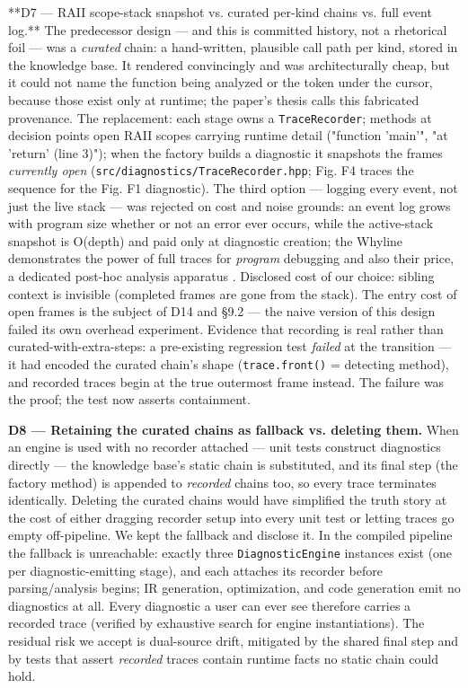 **D7 --- RAII scope-stack snapshot vs. curated per-kind chains vs.
full event log.** The predecessor design --- and this is committed
history, not a rhetorical foil --- was a \emph{curated} chain: a
hand-written, plausible call path per kind, stored in the knowledge
base. It rendered convincingly and was architecturally cheap, but it
could not name the function being analyzed or the token under the
cursor, because those exist only at runtime; the paper's thesis calls
this fabricated provenance. The replacement: each stage owns a
\texttt{TraceRecorder}; methods at decision points open RAII scopes carrying
runtime detail ("function 'main'", "at 'return' (line 3)"); when the
factory builds a diagnostic it snapshots the frames \emph{currently open}
(\texttt{src/diagnostics/TraceRecorder.hpp}; Fig. F4 traces the sequence
for the Fig. F1 diagnostic). The third option --- logging
every event, not just the live stack --- was rejected on cost and noise
grounds: an event log grows with program size whether or not an error
ever occurs, while the active-stack snapshot is O(depth) and paid
only at diagnostic creation; the Whyline demonstrates the power of
full traces for \emph{program} debugging and also their price, a dedicated
post-hoc analysis apparatus \cite{ko2008debugging}. Disclosed cost
of our choice: sibling context is invisible (completed frames are
gone from the stack). The entry cost of open frames is the subject of
D14 and \S9.2 --- the naive version of this design failed its own
overhead experiment. Evidence that recording is real rather than
curated-with-extra-steps: a pre-existing regression test \emph{failed} at
the transition --- it had encoded the curated chain's shape
(\texttt{trace.front()} = detecting method), and recorded traces begin at
the true outermost frame instead. The failure was the proof; the test
now asserts containment.

\textbf{D8 --- Retaining the curated chains as fallback vs. deleting them.}
When an engine is used with no recorder attached --- unit tests
construct diagnostics directly --- the knowledge base's static chain is
substituted, and its final step (the factory method) is appended to
\emph{recorded} chains too, so every trace terminates identically.
Deleting the curated chains would have simplified the truth story at
the cost of either dragging recorder setup into every unit test or
letting traces go empty off-pipeline. We kept the fallback and
disclose it. In the compiled pipeline the fallback is unreachable:
exactly three \texttt{DiagnosticEngine} instances exist (one per
diagnostic-emitting stage), and each attaches its recorder before
parsing/analysis begins; IR generation, optimization, and code
generation emit no diagnostics at all. Every diagnostic a user can
ever see therefore carries a recorded trace (verified by exhaustive
search for engine instantiations). The residual risk we accept is
dual-source drift, mitigated by the shared final step and by tests
that assert \emph{recorded} traces contain runtime facts no static chain
could hold.

